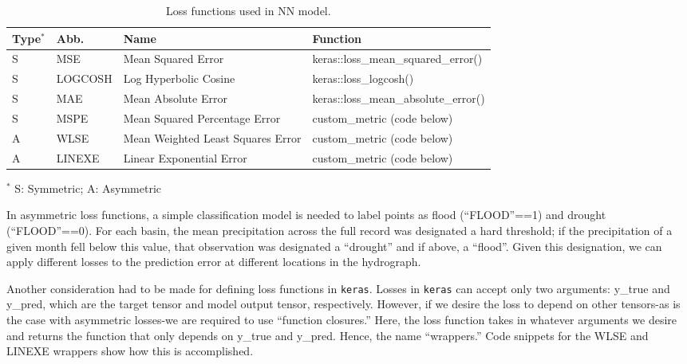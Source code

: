 \begin{table*}[h]\renewcommand{\arraystretch}{0.8} 
	\linespread{0.5}
	\centering
	\caption{Loss functions used in NN model.}
	\begin{tabular}{p{1.2cm}p{2.4cm}p{4.7cm}p{6.5cm}} %
		\toprule
		Type$^{\ast}$ & Abb. & Name & Function\\
		\midrule
		S & MSE & Mean Squared Error & keras::loss\_mean\_squared\_error()\\
		\addlinespace
		S & LOGCOSH & Log Hyperbolic Cosine & keras::loss\_logcosh()\\
		\addlinespace
		S & MAE & Mean Absolute Error & keras::loss\_mean\_absolute\_error()\\
		\addlinespace
		S & MSPE & Mean Squared Percentage Error & custom\_metric (code below)\\
		\addlinespace
		A & WLSE & Mean Weighted Least Squares Error & custom\_metric (code below)\\
		\addlinespace
		A & LINEXE & Linear Exponential Error & custom\_metric (code below)\\
		\bottomrule
	\end{tabular}
   	\begin{tablenotes}
      		\small
      		\item $^{\ast}$ S: Symmetric; A: Asymmetric
	\end{tablenotes}
	\label{table:lossfuncs}
\end{table*}

In asymmetric loss functions, a simple classification model is needed to label points as flood (``FLOOD''==1) and drought (``FLOOD''==0). For each basin, the mean precipitation across the full record was designated a hard threshold; if the precipitation of a given month fell below this value, that observation was designated a ``drought'' and if above, a ``flood''. Given this designation, we can apply different losses to the prediction error at different locations in the hydrograph. 

Another consideration had to be made for defining loss functions in {\tt keras}. Losses in {\tt keras} can accept only two arguments: y\_true and y\_pred, which are the target tensor and model output tensor, respectively. However, if we desire the loss to depend on other tensors-as is the case with asymmetric losses-we are required to use ``function closures.'' Here, the loss function takes in whatever arguments we desire and returns the function that only depends on y\_true and y\_pred. Hence, the name ``wrappers.'' Code snippets for the WLSE and LINEXE wrappers show how this is accomplished. 

